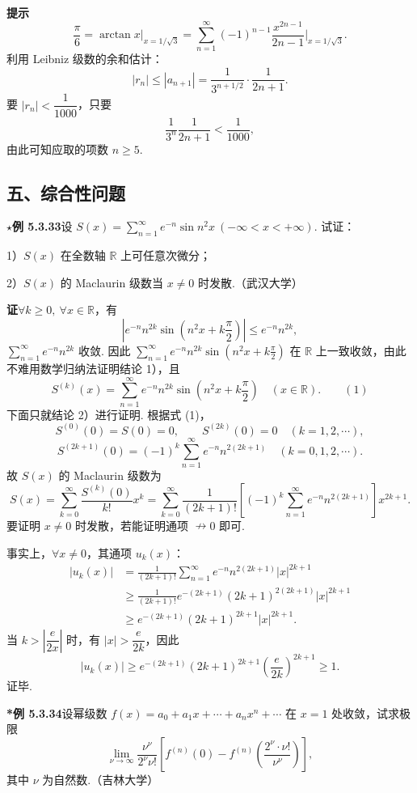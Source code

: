\documentclass[UTF8, 12pt, fontset=fandol, oneside]{ctexart}
\begin{document}
\noindent\textbf{提示}\quad
\[
  \frac\pi6=\arctan x\bigg|_{x=1/\sqrt3}
  =\sum_{n=1}^{\infty}(-1)^{n-1}\frac{x^{2n-1}}{2n-1}\bigg|_{x=1/\sqrt3}.
\]
利用 Leibniz 级数的余和估计：
\[
  |r_n|\le|a_{n+1}|=\frac1{3^{n+1/2}}\cdot\frac1{2n+1}.
\]
要 $|r_n|<\dfrac1{1000}$，只要
\[
  \frac1{3^n}\frac1{2n+1}<\frac1{1000},
\]
由此可知应取的项数 $n\ge5$.

\subsection*{五、综合性问题}

\noindent\(\star\)\textbf{例 5.3.33}\quad 设
$S(x)=\displaystyle\sum_{n=1}^{\infty}e^{-n}\sin n^2x\ (-\infty<x<+\infty)$. 试证：

1）$S(x)$ 在全数轴 $\mathbb R$ 上可任意次微分；

2）$S(x)$ 的 Maclaurin 级数当 $x\ne0$ 时发散.（武汉大学）

\noindent\textbf{证}\quad $\forall k\ge0,\ \forall x\in\mathbb R$，有
\[
  \left|e^{-n}n^{2k}\sin\left(n^2x+k\frac\pi2\right)\right|\le e^{-n}n^{2k},
\]
$\displaystyle\sum_{n=1}^{\infty}e^{-n}n^{2k}$ 收敛. 因此
$\displaystyle\sum_{n=1}^{\infty}e^{-n}n^{2k}\sin\left(n^2x+k\frac\pi2\right)$ 在 $\mathbb R$ 上一致收敛，由此不难用数学归纳法证明结论 1），且
\[
  S^{(k)}(x)=\sum_{n=1}^{\infty}e^{-n}n^{2k}\sin\left(n^2x+k\frac\pi2\right)
  \quad(x\in\mathbb R). \qquad(1)
\]
下面只就结论 2）进行证明. 根据式 (1)，
\[
  S^{(0)}(0)=S(0)=0,\qquad S^{(2k)}(0)=0\quad(k=1,2,\cdots),
\]
\[
  S^{(2k+1)}(0)=(-1)^k\sum_{n=1}^{\infty}e^{-n}n^{2(2k+1)}
  \quad(k=0,1,2,\cdots).
\]
故 $S(x)$ 的 Maclaurin 级数为
\[
  S(x)=\sum_{k=0}^{\infty}\frac{S^{(k)}(0)}{k!}x^k
  =\sum_{k=0}^{\infty}\frac1{(2k+1)!}
  \left[(-1)^k\sum_{n=1}^{\infty}e^{-n}n^{2(2k+1)}\right]x^{2k+1}.
\]
要证明 $x\ne0$ 时发散，若能证明通项 $\nrightarrow0$ 即可.

事实上，$\forall x\ne0$，其通项 $u_k(x)$：
\[
\begin{aligned}
|u_k(x)|
&=\frac1{(2k+1)!}\sum_{n=1}^{\infty}e^{-n}n^{2(2k+1)}|x|^{2k+1}\\
&\ge\frac1{(2k+1)!}e^{-(2k+1)}(2k+1)^{2(2k+1)}|x|^{2k+1}\\
&\ge e^{-(2k+1)}(2k+1)^{2k+1}|x|^{2k+1}.
\end{aligned}
\]
当 $k>\left|\dfrac{e}{2x}\right|$ 时，有 $|x|>\dfrac e{2k}$，因此
\[
  |u_k(x)|\ge e^{-(2k+1)}(2k+1)^{2k+1}\left(\frac e{2k}\right)^{2k+1}\ge1.
\]
证毕.

\noindent\textbf{*例 5.3.34}\quad 设幂级数
$f(x)=a_0+a_1x+\cdots+a_nx^n+\cdots$ 在 $x=1$ 处收敛，试求极限
\[
  \lim_{\nu\to\infty}\frac{\nu^\nu}{2^\nu\nu!}
  \left[f^{(n)}(0)-f^{(n)}\left(\frac{2^\nu\cdot\nu!}{\nu^\nu}\right)\right],
\]
其中 $\nu$ 为自然数.（吉林大学）
\end{document}
